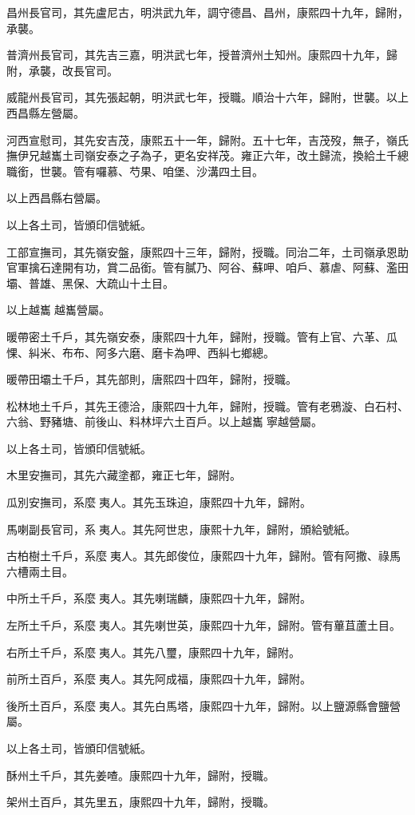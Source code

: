 \begin{pinyinscope}
昌州長官司，其先盧尼古，明洪武九年，調守德昌、昌州，康熙四十九年，歸附，承襲。

普濟州長官司，其先吉三嘉，明洪武七年，授普濟州土知州。康熙四十九年，歸附，承襲，改長官司。

威龍州長官司，其先張起朝，明洪武七年，授職。順治十六年，歸附，世襲。以上西昌縣左營屬。

河西宣慰司，其先安吉茂，康熙五十一年，歸附。五十七年，吉茂歿，無子，嶺氏撫伊兄越巂土司嶺安泰之子為子，更名安祥茂。雍正六年，改土歸流，換給土千總職銜，世襲。管有囉慕、芍果、咱堡、沙溝四土目。

以上西昌縣右營屬。

以上各土司，皆頒印信號紙。

工部宣撫司，其先嶺安盤，康熙四十三年，歸附，授職。同治二年，土司嶺承恩助官軍擒石達開有功，賞二品銜。管有膩乃、阿谷、蘇呷、咱戶、慕虐、阿蘇、濫田壩、普雄、黑保、大疏山十土目。

以上越巂越巂營屬。

暖帶密土千戶，其先嶺安泰，康熙四十九年，歸附，授職。管有上官、六革、瓜惈、糾米、布布、阿多六磨、磨卡為呷、西糾七鄉總。

暖帶田壩土千戶，其先部則，唐熙四十四年，歸附，授職。

松林地土千戶，其先王德洽，康熙四十九年，歸附，授職。管有老鴉漩、白石村、六翁、野豬塘、前後山、料林坪六土百戶。以上越巂寧越營屬。

以上各土司，皆頒印信號紙。

木里安撫司，其先六藏塗都，雍正七年，歸附。

瓜別安撫司，系麼夷人。其先玉珠迫，康熙四十九年，歸附。

馬喇副長官司，系夷人。其先阿世忠，康熙十九年，歸附，頒給號紙。

古柏樹土千戶，系麼夷人。其先郎俊位，康熙四十九年，歸附。管有阿撒、祿馬六槽兩土目。

中所土千戶，系麼夷人。其先喇瑞麟，康熙四十九年，歸附。

左所土千戶，系麼夷人。其先喇世英，康熙四十九年，歸附。管有蓽苴蘆土目。

右所土千戶，系麼夷人。其先八璽，康熙四十九年，歸附。

前所土百戶，系麼夷人。其先阿成福，康熙四十九年，歸附。

後所土百戶，系麼夷人。其先白馬塔，康熙四十九年，歸附。以上鹽源縣會鹽營屬。

以上各土司，皆頒印信號紙。

酥州土千戶，其先姜喳。康熙四十九年，歸附，授職。

架州土百戶，其先里五，康熙四十九年，歸附，授職。


\end{pinyinscope}
